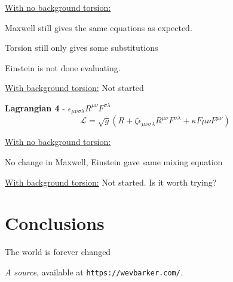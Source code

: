 \documentclass[letterpaper,12pt]{article}
\begin{document}
\underline{With no background torsion:}

Maxwell still gives the same equations as expected.

Torsion still only gives some substitutions

Einstein is not done evaluating.



\underline{With background torsion:}
Not started


\textbf{Lagrangian 4} - $\epsilon_{\mu \nu \sigma \lambda} R^{\mu \nu} F^{\sigma \lambda}$
\begin{equation}
\mathcal{L}=\sqrt{g}(R+\zeta \epsilon_{\mu \nu \sigma \lambda} R^{\mu \nu} F^{\sigma \lambda}+\kappa F{\mu \nu}F^{\mu \nu})
\end{equation}

\underline{With no background torsion:}

No change in Maxwell, Einstein gave same mixing equation

\underline{With background torsion:}
Not started. Is it worth trying?


\section{Conclusions}
The world is forever changed


\begin{thebibliography}{99}

 \emph{A source},  available at
\texttt{https://wevbarker.com/}.

\end{thebibliography}
\end{document}
